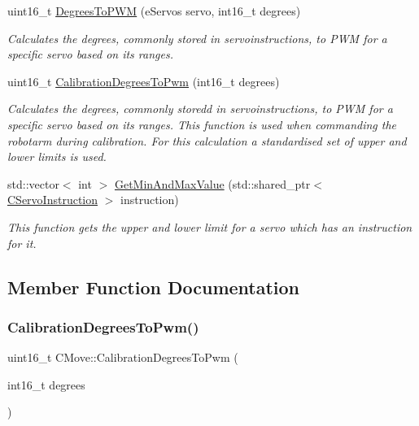 \begin{DoxyCompactItemize}
uint16\+\_\+t \hyperlink{classCMove_a716dede77aa60e3b3254f1d436cf2c40}{Degrees\+To\+P\+WM} (e\+Servos servo, int16\+\_\+t degrees)
\begin{DoxyCompactList}\small\item\em Calculates the degrees, commonly stored in servoinstructions, to P\+WM for a specific servo based on its ranges. \end{DoxyCompactList}\item 
uint16\+\_\+t \hyperlink{classCMove_ace7c94d5da8fed1ae1f9cad3d17bba3f}{Calibration\+Degrees\+To\+Pwm} (int16\+\_\+t degrees)
\begin{DoxyCompactList}\small\item\em Calculates the degrees, commonly storedd in servoinstructions, to P\+WM for a specific servo based on its ranges. This function is used when commanding the robotarm during calibration. For this calculation a standardised set of upper and lower limits is used. \end{DoxyCompactList}\item 
std\+::vector$<$ int $>$ \hyperlink{classCMove_ae34b579c70c71a761af9245db1b7571e}{Get\+Min\+And\+Max\+Value} (std\+::shared\+\_\+ptr$<$ \hyperlink{classCServoInstruction}{C\+Servo\+Instruction} $>$ instruction)
\begin{DoxyCompactList}\small\item\em This function gets the upper and lower limit for a servo which has an instruction for it. \end{DoxyCompactList}\end{DoxyCompactItemize}


\subsection{Member Function Documentation}
\mbox{\label{classCMove_ace7c94d5da8fed1ae1f9cad3d17bba3f}} 
\subsubsection{\texorpdfstring{Calibration\+Degrees\+To\+Pwm()}{CalibrationDegreesToPwm()}}
{\footnotesize\ttfamily uint16\+\_\+t C\+Move\+::\+Calibration\+Degrees\+To\+Pwm (\begin{DoxyParamCaption}\item[{int16\+\_\+t}]{degrees }\end{DoxyParamCaption})}



